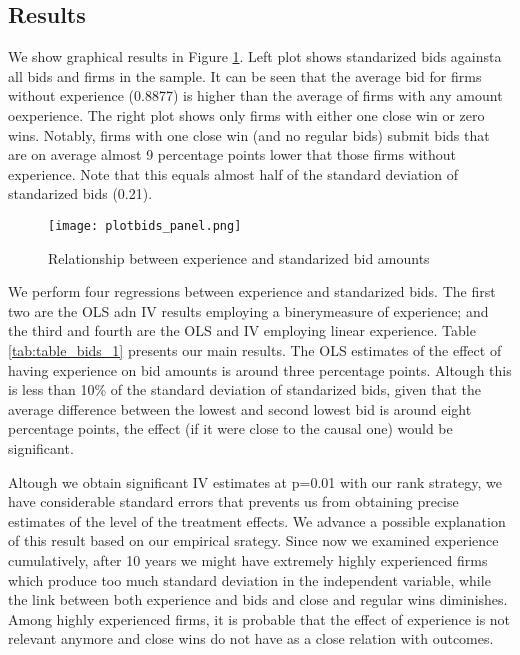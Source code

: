 

\subsection{Results}
We show graphical results in Figure \ref{fig:plotbids_panel}. Left plot shows standarized bids againsta all bids and firms in the sample. It can be seen that the average bid for firms without experience (0.8877) is higher than the average of firms with any amount oexperience. The right plot shows only firms with either one close win or zero wins. Notably, firms with one close win (and no regular bids) submit bids that are on average almost 9 percentage points lower that those firms without experience. Note that this equals almost half of the standard deviation of standarized bids (0.21).

\begin{figure}[H]
  \texttt{[image: plotbids\_panel.png]}
  \caption{Relationship between experience and standarized bid amounts}
  \label{fig:plotbids_panel}
\end{figure}

We perform four regressions between experience and standarized bids. The first two are the OLS  adn IV results employing a binerymeasure of experience; and the third and fourth are the OLS and IV employing linear experience. Table \ref{tab:table_bids_1} presents our main results. The OLS estimates of the effect of having experience on bid amounts is around three percentage points. Altough this is less than 10\% of the standard deviation of standarized bids, given that the average difference between the lowest and second lowest bid is around eight percentage points, the effect (if it were close to the causal one) would be significant.

Altough we obtain significant IV estimates at p=0.01 with our rank strategy, we have considerable standard errors that prevents us from obtaining precise estimates of the level of the treatment effects. We advance a possible explanation of this result based on our empirical srategy. Since now we examined experience cumulatively, after 10 years we might have extremely highly experienced firms which produce too much standard deviation in the independent variable, while the link between  both experience and bids and close and regular wins diminishes. Among highly experienced firms, it is probable that the effect of experience is not relevant anymore and close wins do not have as a close relation with outcomes.


